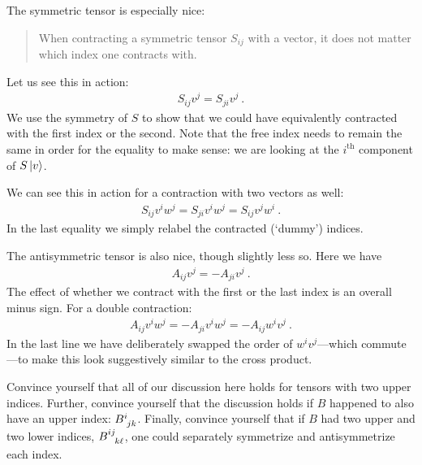 \begin{subappendices}
The symmetric tensor is especially nice:
\begin{quote}
When contracting a symmetric tensor $S_{ij}$ with a vector, it does not matter which index one contracts with. 
\end{quote}
Let us see this in action:
\begin{align}
    S_{ij}v^j = S_{ji}v^j \ .
\end{align}
We use the symmetry of $S$ to show that we could have equivalently contracted with the first index or the second. Note that the free index needs to remain the same in order for the equality to make sense: we are looking at the $i^\text{th}$ component of $S\left|v\right\rangle$.

We can see this in action for a contraction with two vectors as well:
\begin{align}
    S_{ij}v^iw^j = S_{ji}v^i w^j = S_{ij} v^j w^i \ .
    \label{eq:symmetric:with:two:vectors}
\end{align}
In the last equality we simply relabel the contracted (`dummy') indices.

The antisymmetric tensor is also nice, though slightly less so. Here we have
\begin{align}
    A_{ij}v^j = - A_{ji}v^j \ .
\end{align}
The effect of whether we contract with the first or the last index is an overall minus sign. For a double contraction:
\begin{align}
    A_{ij}v^iw^j = -A_{ji}v^i w^j = -A_{ij} w^i v^j \ .
\end{align}
In the last line we have deliberately swapped the order of $w^i v^j$---which commute---to make this look suggestively similar to the cross product. 





\begin{exercise}
Convince yourself that all of our discussion here holds for tensors with two upper indices. Further, convince yourself that the discussion holds if $B$ happened to also have an upper index: $B\aij{i}{jk}$. Finally, convince yourself that if $B$ had two upper and two lower indices, $B\aij{ij}{k\ell}$, one could separately symmetrize and antisymmetrize each index.
\end{exercise}




\end{subappendices}
